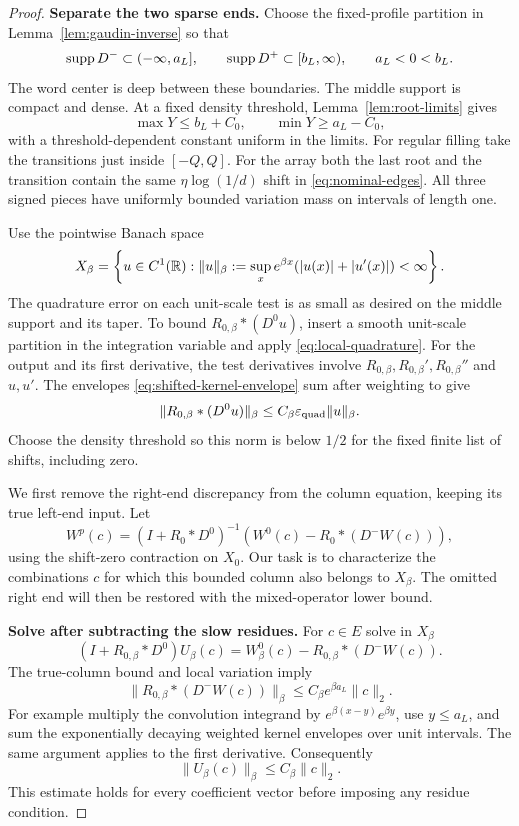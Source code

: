 \begin{proof}
\smallskip\noindent\textbf{Separate the two sparse ends.}
Choose the fixed-profile partition in Lemma~\ref{lem:gaudin-inverse}
so that
\[
 \operatorname{supp} D^-\subset(-\infty,a_L],\qquad
 \operatorname{supp} D^+\subset[b_L,\infty),\qquad a_L<0<b_L.
 \]
The word center is deep between these boundaries.  The middle
support is compact and dense.  At a fixed density threshold,
Lemma~\ref{lem:root-limits} gives
\begin{equation}\label{eq:last-node-split}
 \max Y\le b_L+C_0,\qquad \min Y\ge a_L-C_0,
\end{equation}
with a threshold-dependent constant uniform in the limits.
For regular filling take the transitions just inside $[-Q,Q]$.
For the array both the last root and the transition contain the
same $\eta\log(1/d)$ shift in \eqref{eq:nominal-edges}.
All three signed pieces have uniformly bounded variation mass
on intervals of length one.

Use the pointwise Banach space
\[
 X_\beta=\left\{u\in C^1(\mathbb R):
       \|u\|_\beta:=\sup_x e^{\beta x}
                  (|u(x)|+|u'(x)|)<\infty\right\}.
\]
The quadrature error on each unit-scale test is as small as desired
on the middle support and its taper.  To bound
$R_{0,\beta}*(D^0u)$, insert a smooth unit-scale partition in the
integration variable and apply \eqref{eq:local-quadrature}.
For the output and its first derivative, the test derivatives
involve $R_{0,\beta},R_{0,\beta}',R_{0,\beta}''$ and $u,u'$.
The envelopes \eqref{eq:shifted-kernel-envelope} sum after
weighting to give
\[
 \|R_{0,\beta}*(D^0u)\|_\beta
       \le C_\beta\varepsilon_{\rm quad}\|u\|_\beta.
\]
Choose the density threshold so this norm is below $1/2$ for the
fixed finite list of shifts, including zero.

We first remove the right-end discrepancy from the column equation,
keeping its true left-end input.  Let
\[
 W^p(c)=(I+R_0*D^0)^{-1}
             (W^0(c)-R_0*(D^-W(c))),
\]
using the shift-zero contraction on $X_0$.
Our task is to characterize the combinations $c$ for which this
bounded column also belongs to $X_\beta$.  The omitted right end will
then be restored with the mixed-operator lower bound.

\smallskip\noindent\textbf{Solve after subtracting the slow residues.}
For $c\in E$ solve in $X_\beta$
\begin{equation}\label{eq:shifted-middle-equation}
 (I+R_{0,\beta}*D^0)U_\beta(c)
     =W^0_\beta(c)-R_{0,\beta}*(D^-W(c)).
\end{equation}
The true-column bound and local variation imply
\[
 \|R_{0,\beta}*(D^-W(c))\|_\beta
       \le C_\beta e^{\beta a_L}\|c\|_2.
\]
For example multiply the convolution integrand by
$e^{\beta(x-y)}e^{\beta y}$, use $y\le a_L$, and sum the
exponentially decaying weighted kernel envelopes over unit
intervals.  The same argument applies to the first derivative.
Consequently
\begin{equation}\label{eq:shifted-solution-bound}
 \|U_\beta(c)\|_\beta\le C_\beta\|c\|_2.
\end{equation}
This estimate holds for every coefficient vector before imposing
any residue condition.


\end{proof}
